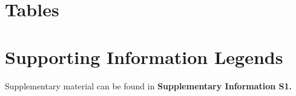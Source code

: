 \documentclass[11pt]{article}
\begin{document}
\clearpage

\section*{Tables}

\section*{Supporting Information Legends}

Supplementary material can be found in {\bf Supplementary Information S1.}
\end{document}
